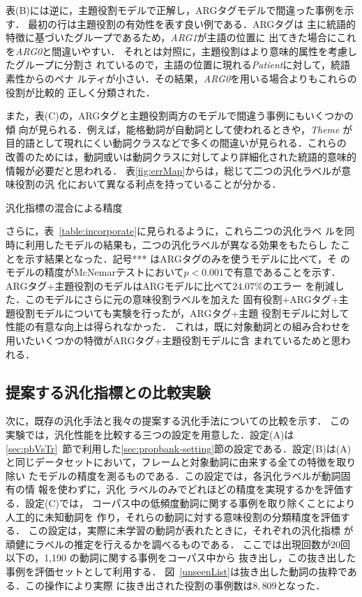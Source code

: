 \documentclass[japanese]{jnlp_1.4}
\begin{document}
表(B)には逆に，主題役割モデルで正解し，ARGタグモデルで間違った事例を示す．
最初の行は主題役割の有効性を表す良い例である．ARGタグは
主に統語的特徴に基づいたグループであるため，{\it ARG1}が主語の位置に
出てきた場合にこれを{\it ARG0}と間違いやすい．
それとは対照に，主題役割はより意味的属性を考慮したグループに分割さ
れているので，主語の位置に現れる{\it Patient}に対して，統語素性からのペナ
ルティが小さい．その結果，{\it ARG0}を用いる場合よりもこれらの役割が比較的
正しく分類された．

また，表(C)の，ARGタグと主題役割両方のモデルで間違う事例にもいくつかの傾
向が見られる．例えば，能格動詞が自動詞として使われるときや，{\it Theme}
が目的語として現れにくい動詞クラスなどで多くの間違いが見られる．これらの
改善のためには，動詞或いは動詞クラスに対してより詳細化された統語的意味的
情報が必要だと思われる．
表\ref{fig:errMap}からは，総じて二つの汎化ラベルが意味役割の汎
化において異なる利点を持っていることが分かる．

\begin{table}[b]
\caption{汎化指標の混合による精度}
\label{table:incorporate} 

\end{table}

さらに，表~\ref{table:incorporate}に見られるように，これら二つの汎化ラベ
ルを同時に利用したモデルの結果も，二つの汎化ラベルが異なる効果をもたらし
たことを示す結果となった．記号*** はARGタグのみを使うモデルに比べて，そ
のモデルの精度がMcNemarテストにおいて$p < 0.001$で有意であることを示す．
ARGタグ+主題役割のモデルはARGモデルに比べて$24.07\%$のエラー
を削減した．このモデルにさらに元の意味役割ラベルを加えた
固有役割+ARGタグ+主題役割モデルについても実験を行ったが，ARGタグ+主題
役割モデルに対して性能の有意な向上は得られなかった．
これは，既に対象動詞との組み合わせを用いたいくつかの特徴がARGタグ+主題役割モデルに含
まれているためと思われる．



\subsection{提案する汎化指標との比較実験}

次に，既存の汎化手法と我々の提案する汎化手法についての比較を示す．
この実験では，汎化性能を比較する三つの設定を用意した．設定(A)は
\ref{sec:pbVsTr}~節で利用した\ref{sec:propbank-setting}節の設定である．設定(B)は(A)
と同じデータセットにおいて，フレームと対象動詞に由来する全ての特徴を取り除い
たモデルの精度を測るものである．この設定では，各汎化ラベルが動詞固有の情
報を使わずに，汎化
ラベルのみでどれほどの精度を実現するかを評価する．設定(C)では，
コーパス中の低頻度動詞に関する事例を取り除くことにより人工的に未知動詞を
作り，それらの動詞に対する意味役割の分類精度を評価する．
この設定は，実際に未学習の動詞が表れたときに，それぞれの汎化指標
が頑健にラベルの推定を行えるかを調べるものである．
ここでは出現回数が$20$回以下の，1,190 の動詞に関する事例をコーパス中から
抜き出し，この抜き出した事例を評価セットとして利用する．
図~\ref{unseenList}は抜き出した動詞の抜粋である．この操作により実際
に抜き出された役割の事例数は$8,809$となった．
\end{document}
